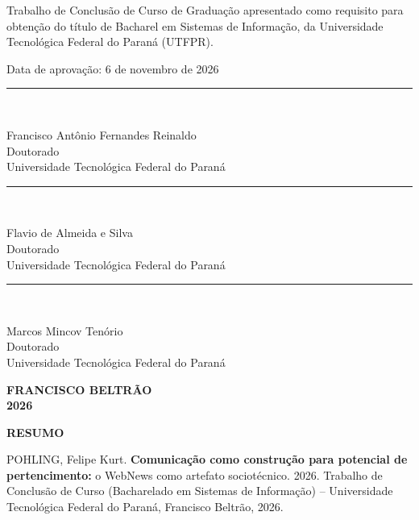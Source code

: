 \documentclass[12pt,a4paper]{article}
\newcommand{\cidade}{FRANCISCO BELTRÃO}
\newcommand{\ano}{2026}
\newcommand{\natureza}{Trabalho de Conclusão de Curso de Graduação
  apresentado como requisito para obtenção do título de Bacharel em
  Sistemas de Informação, da Universidade Tecnológica Federal do Paraná
  (UTFPR).}
\newcommand{\membro}[3]{%
  \begin{center}
    \rule{\linewidth}{0.4pt}\\
    {\small #1\\ #2\\ #3\par}
  \end{center}}
\begin{document}
\vspace{1.5cm}

\hfill
\begin{minipage}{0.5\textwidth}
  \small\singlespacing
  \natureza
\end{minipage}

\vspace{1.5cm}

\begin{center}
  {\small Data de aprovação: 6 de novembro de 2026}
\end{center}

\vfill

\membro{Francisco Antônio Fernandes Reinaldo}
       {Doutorado}
       {Universidade Tecnológica Federal do Paraná}
\vfill
\membro{Flavio de Almeida e Silva}
       {Doutorado}
       {Universidade Tecnológica Federal do Paraná}
\vfill
\membro{Marcos Mincov Tenório}
       {Doutorado}
       {Universidade Tecnológica Federal do Paraná}

\vfill

\begin{center}
  \begin{onehalfspace}
  \textbf{\cidade}\\
  \textbf{\ano}
  \end{onehalfspace}
\end{center}
\clearpage

\begin{center}
  \begin{onehalfspace}
  \textbf{RESUMO}
  \end{onehalfspace}
\end{center}
\vspace{1cm}

\begin{singlespace}
\raggedright
POHLING, Felipe Kurt. \textbf{Comunicação como construção para potencial
de pertencimento:} o WebNews como artefato sociotécnico. 2026. Trabalho
de Conclusão de Curso (Bacharelado em Sistemas de Informação) --
Universidade Tecnológica Federal do Paraná, Francisco Beltrão, 2026.
\par
\end{singlespace}

\vspace{0.6cm}
\end{document}
